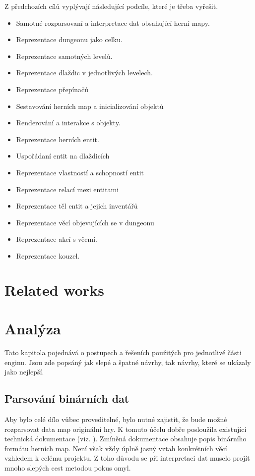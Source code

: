 Z předchozích cílů vyplývají následující podcíle, které je třeba vyřešit. 
\begin{itemize}
\item Samotné rozparsovaní a interpretace dat obsahující herní mapy. 
\item Reprezentace dungeonu jako celku.
\item Reprezentace samotných levelů.
\item Reprezentace dlaždic v jednotlivých levelech.
\item Reprezentace přepínačů 
\item Sestavování herních map a inicializování objektů
\item Renderování a interakce s objekty.
\item Reprezentace herních entit.
\item Uspořádaní entit na dlaždicích
\item Reprezentace vlastností a schopností entit
\item Reprezentace relací mezi entitami
\item Reprezentace těl entit a jejich inventářů
\item Reprezentace věcí objevujících se v dungeonu
\item Reprezentace akcí s věcmi.
\item Reprezentace kouzel.
\end{itemize}
	
\chapter{Related works}

\chapter{Analýza}
Tato kapitola pojednává o postupech a řešeních použitých pro jednotlivé části enginu. Jsou zde popsáný jak slepé a špatné
návrhy, tak návrhy, které se ukázaly jako nejlepší.

\section{Parsování binárních dat}
Aby bylo celé dílo vůbec proveditelné, bylo nutné zajistit, že bude možné rozparsovat data map originální hry. K tomuto účelu
dobře posloužila existující technická dokumentace (viz. \citet{TechnicalDocumentationFontanel05}). Zmíněná dokumentace obsahuje
popis binárního formátu herních map. Není však vždy úplně jasný vztah konkrétních věcí vzhledem k celému projektu. Z toho důvodu
se při interpretaci dat muselo projít mnoho slepých cest metodou pokus omyl. 

